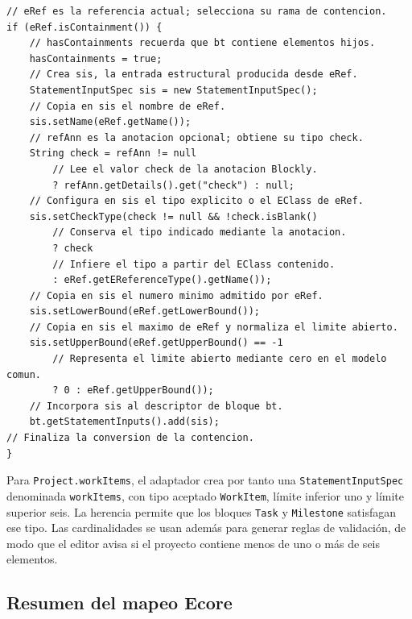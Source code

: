 \begin{lstlisting}[style=tfmjavaecore, captionpos=t, caption={Fragmento comentado de la conversión de una contención Ecore}, label={lst:conversion-containment-ecore}]
// eRef es la referencia actual; selecciona su rama de contencion.
if (eRef.isContainment()) {
    // hasContainments recuerda que bt contiene elementos hijos.
    hasContainments = true;
    // Crea sis, la entrada estructural producida desde eRef.
    StatementInputSpec sis = new StatementInputSpec();
    // Copia en sis el nombre de eRef.
    sis.setName(eRef.getName());
    // refAnn es la anotacion opcional; obtiene su tipo check.
    String check = refAnn != null
        // Lee el valor check de la anotacion Blockly.
        ? refAnn.getDetails().get("check") : null;
    // Configura en sis el tipo explicito o el EClass de eRef.
    sis.setCheckType(check != null && !check.isBlank()
        // Conserva el tipo indicado mediante la anotacion.
        ? check
        // Infiere el tipo a partir del EClass contenido.
        : eRef.getEReferenceType().getName());
    // Copia en sis el numero minimo admitido por eRef.
    sis.setLowerBound(eRef.getLowerBound());
    // Copia en sis el maximo de eRef y normaliza el limite abierto.
    sis.setUpperBound(eRef.getUpperBound() == -1
        // Representa el limite abierto mediante cero en el modelo comun.
        ? 0 : eRef.getUpperBound());
    // Incorpora sis al descriptor de bloque bt.
    bt.getStatementInputs().add(sis);
// Finaliza la conversion de la contencion.
}
\end{lstlisting}

Para \texttt{Project.workItems}, el adaptador crea por tanto una
\texttt{StatementInputSpec} denominada \texttt{workItems}, con tipo aceptado
\texttt{WorkItem}, límite inferior uno y límite superior seis. La herencia
permite que los bloques \texttt{Task} y \texttt{Milestone} satisfagan ese tipo.
Las cardinalidades se usan además para generar reglas de validación, de modo que
el editor avisa si el proyecto contiene menos de uno o más de seis elementos.

\subsection{Resumen del mapeo Ecore}

